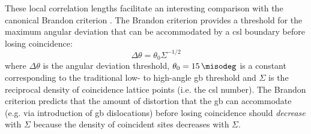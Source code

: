 \documentclass[final,twocolumn,12pt]{elsarticle}
\begin{document}
    
    These local correlation lengths facilitate an interesting comparison with the canonical Brandon criterion \cite{brandonStructureHighangleGrain1966a}. The Brandon criterion provides a threshold for the maximum angular deviation that can be accommodated by a \gls{csl} boundary before losing coincidence:
    \begin{equation}
        \Delta \theta = \theta_0 {\Sigma}^{-1/2}
        \label{eq:brandoncriterion}
    \end{equation}
    where $\Delta \theta$ is the angular deviation threshold, $\theta_0 = \SI{15}{\misodeg}$ is a constant corresponding to the traditional low- to high-angle \gls{gb} threshold and $\Sigma$ is the reciprocal density of coincidence lattice points (i.e. the \gls{csl} number). The Brandon criterion predicts that the amount of distortion that the \gls{gb} can accommodate (e.g. via introduction of \gls{gb} dislocations) before losing coincidence should \emph{decrease} with $\Sigma$ because the density of coincident sites decreases with $\Sigma$.
    
\end{document}
